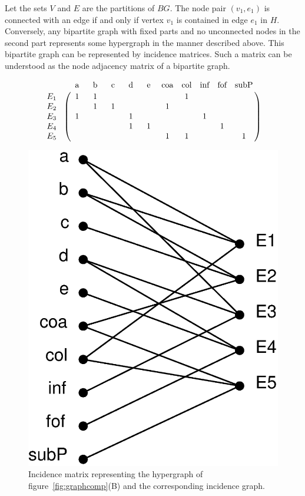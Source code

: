 \begin{mydef}
Let the sets $V$ and $E$ are the partitions of $BG$. The node pair $(v_1, e_1)$ is connected with an edge if and only if vertex $v_1$ is contained in edge $e_1$ in $H$. Conversely, any bipartite graph with fixed parts and no unconnected nodes in the second part represents some hypergraph in the manner described above. This bipartite graph can be represented by incidence matrices. Such a matrix can be understood as the node adjacency matrix of a bipartite graph.
\end{mydef}
\begin{figure}[tbh]
\centering
\begin{minipage}[c]{0.58\textwidth}\centering
\[ \bordermatrix{ ~       &  \text{~a~}  &  \text{~b~}  &  \text{~c~}  &  \text{~d~}  &  \text{~e~}  &   \text{coa} &   \text{col} &   \text{inf} &   \text{fof} &   \text{subP}\cr
                  E_1~~   &   1   &   1   &       &       &       &       &   1   &       &       &       \cr
                  E_2~~   &       &   1   &   1   &       &       &   1   &       &       &       &       \cr
                  E_3~~   &   1   &       &       &   1   &       &       &       &   1   &       &       \cr
                  E_4~~   &       &       &       &   1   &   1   &       &       &       &   1   &       \cr
                  E_5~~   &       &       &       &       &       &   1   &   1   &       &       &    1}
\]
\end{minipage}
\hfill
\begin{minipage}[c]{0.38\textwidth}\centering
\includegraphics[width=.7\textwidth]{fig/BG-black.eps}
\end{minipage}
\caption{\label{fig:incidence}Incidence matrix representing the hypergraph of figure~\ref{fig:graphcomp}(B) and the corresponding incidence graph.}
\end{figure}

